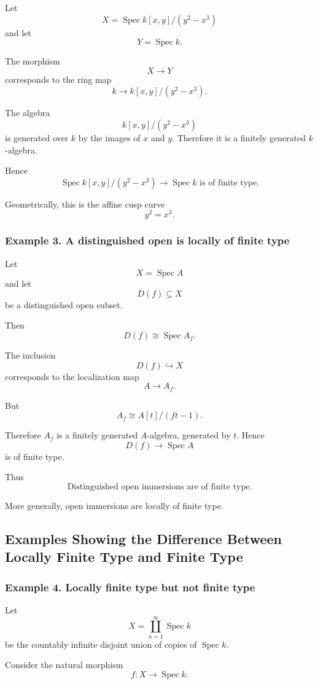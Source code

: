 \documentclass[12pt,a4paper]{article}
\theoremstyle{notespace}
\begin{document}
Let
\[
X=\operatorname{Spec}k[x,y]/(y^2-x^3)
\]
and let
\[
Y=\operatorname{Spec}k.
\]

The morphism
\[
X\to Y
\]
corresponds to the ring map
\[
k\to k[x,y]/(y^2-x^3).
\]

The algebra
\[
k[x,y]/(y^2-x^3)
\]
is generated over \(k\) by the images of \(x\) and \(y\). Therefore it is a finitely generated \(k\)-algebra.

Hence
\[
\boxed{
	\operatorname{Spec}k[x,y]/(y^2-x^3)
	\to
	\operatorname{Spec}k
	\text{ is of finite type.}
}
\]

Geometrically, this is the affine cusp curve
\[
y^2=x^3.
\]

\subsubsection*{Example 3. A distinguished open is locally of finite type}

Let
\[
X=\operatorname{Spec}A
\]
and let
\[
D(f)\subseteq X
\]
be a distinguished open subset.

Then
\[
D(f)\cong \operatorname{Spec}A_f.
\]

The inclusion
\[
D(f)\hookrightarrow X
\]
corresponds to the localization map
\[
A\to A_f.
\]

But
\[
A_f\cong A[t]/(ft-1).
\]

Therefore \(A_f\) is a finitely generated \(A\)-algebra, generated by \(t\). Hence
\[
D(f)\to \operatorname{Spec}A
\]
is of finite type.

Thus
\[
\boxed{
	\text{Distinguished open immersions are of finite type.}
}
\]

More generally, open immersions are locally of finite type.

\subsection{Examples Showing the Difference Between Locally Finite Type and Finite Type}

\subsubsection*{Example 4. Locally finite type but not finite type}

Let
\[
X=\coprod_{n=1}^{\infty}\operatorname{Spec}k
\]
be the countably infinite disjoint union of copies of \(\operatorname{Spec}k\).

Consider the natural morphism
\[
f:X\to \operatorname{Spec}k.
\]
\end{document}
